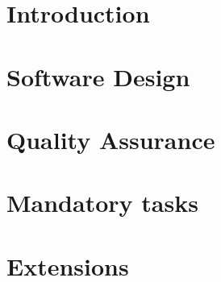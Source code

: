 

	
	\frontmatter
		
	
	\newpage	
	\tableofcontents 
	
	\mainmatter
	
	\chapter{Introduction}
	

	\chapter{Software Design}
	
	
	\chapter{Quality Assurance}
	
	
	\chapter{Mandatory tasks}
	
	
	
	
	
	\chapter{Extensions}
	
	
	
	
	
	
	
	\backmatter
	

